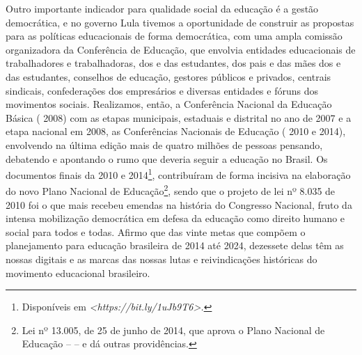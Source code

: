 Outro importante indicador para qualidade social da educação é a gestão
democrática, e no governo Lula tivemos a oportunidade de construir as
propostas para as políticas educacionais de forma democrática, com uma
ampla comissão organizadora da Conferência de Educação, que envolvia
entidades educacionais de trabalhadores e trabalhadoras, dos e das
estudantes, dos pais e das mães dos e das estudantes, conselhos de
educação, gestores públicos e privados, centrais sindicais,
confederações dos empresários e diversas entidades e fóruns dos
movimentos sociais. Realizamos, então, a Conferência Nacional da
Educação Básica ( 2008) com as etapas municipais, estaduais e
distrital no ano de 2007 e a etapa nacional em 2008, as Conferências
Nacionais de Educação ( 2010 e 2014), envolvendo na última edição
mais de quatro milhões de pessoas pensando, debatendo e apontando o rumo
que deveria seguir a educação no Brasil. Os documentos finais da 
2010 e 2014\footnote{Disponíveis em \emph{\textless{}https://bit.ly/1uJb9T6\textgreater{}.}},
contribuíram de forma incisiva na elaboração do novo Plano Nacional de
Educação\footnote{Lei nº 13.005, de 25 de junho de 2014, que aprova
  o Plano Nacional de Educação --  -- e dá outras providências.}, sendo que o
projeto de lei nº 8.035 de 2010 foi o que mais recebeu emendas
na história do Congresso Nacional, fruto da intensa mobilização
democrática em defesa da educação como direito humano e social para
todos e todas. Afirmo que das vinte metas que compõem o planejamento
para educação brasileira de 2014 até 2024, dezessete delas têm as nossas
digitais e as marcas das nossas lutas e reivindicações históricas do
movimento educacional brasileiro.

